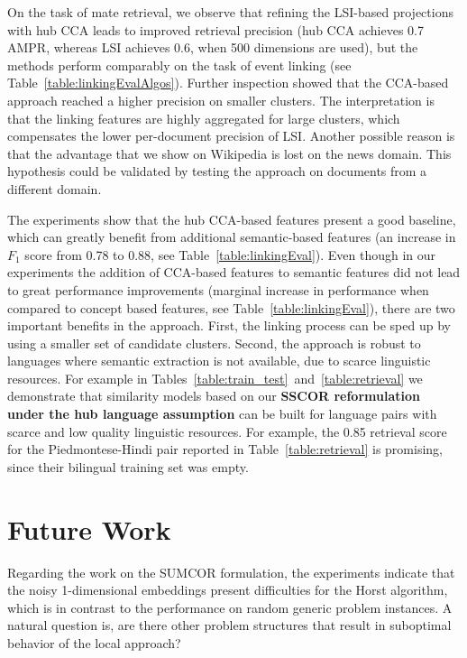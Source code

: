 On the task of mate retrieval, we observe that refining the LSI-based
projections with hub CCA leads to improved retrieval precision (hub CCA
achieves 0.7 AMPR, whereas LSI achieves 0.6, when 500 dimensions are used), but the
methods perform comparably on the task of event linking (see Table~\ref{table:linkingEvalAlgos}).
Further inspection showed that the CCA-based approach reached a higher precision on smaller
clusters. The interpretation is that the linking features are highly
aggregated for large clusters, which compensates the lower per-document
precision of LSI. Another possible reason is that the advantage that we
show on Wikipedia is lost on the news domain. This hypothesis could be
validated by testing the approach on documents from a different domain.

The experiments show that the hub CCA-based features present a good baseline,
which can greatly benefit from additional semantic-based features (an increase
in $F_1$ score from 0.78 to 0.88, see Table~\ref{table:linkingEval}).
Even though in our experiments the addition of CCA-based features to semantic features did not
lead to great performance improvements (marginal increase in performance when compared
to concept based features, see Table~\ref{table:linkingEval}), there are two important benefits in the
approach. First, the linking process can be sped up by using a smaller set of
candidate clusters. Second, the approach is robust to languages where semantic
extraction is not available, due to scarce linguistic resources.
For example in Tables~\ref{table:train_test}~and~\ref{table:retrieval} we demonstrate
that similarity models based on our \textbf{SSCOR reformulation under the hub language
assumption} can be built for language pairs with scarce and
low quality linguistic resources. For example, the 0.85 retrieval score
for the Piedmontese-Hindi pair reported in Table~\ref{table:retrieval} is
promising, since their bilingual training set was empty.

\section{Future Work}

Regarding the work on the SUMCOR formulation, the experiments indicate
that the noisy 1-dimensional embeddings present difficulties for the Horst
algorithm, which is in contrast to the performance on random generic problem instances. A natural
question is, are there other problem structures that result in suboptimal behavior of the local approach?

